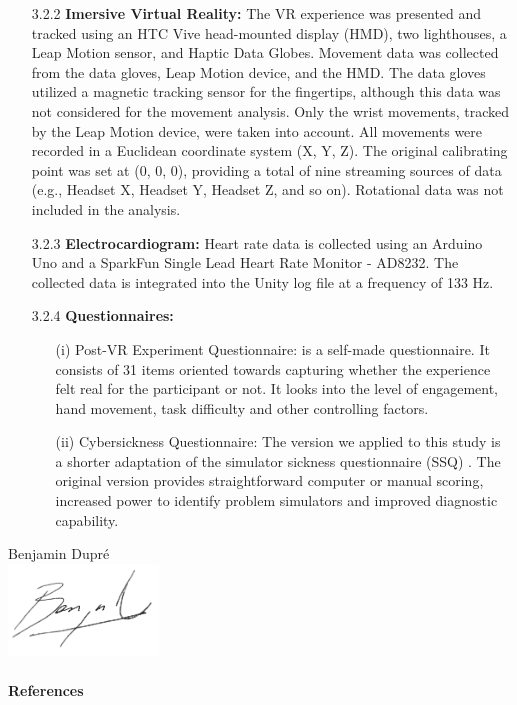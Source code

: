\documentclass[12pt,oneside,openright]{report}
\begin{document}
\begin{enumerate}
    \item[3.2.2] \textbf{Imersive Virtual Reality:} The VR experience was presented and tracked using an HTC Vive head-mounted display (HMD), two lighthouses, a Leap Motion sensor, and Haptic Data Globes. Movement data was collected from the data gloves, Leap Motion device, and the HMD. The data gloves utilized a magnetic tracking sensor for the fingertips, although this data was not considered for the movement analysis. Only the wrist movements, tracked by the Leap Motion device, were taken into account. All movements were recorded in a Euclidean coordinate system (X, Y, Z). The original calibrating point was set at (0, 0, 0), providing a total of nine streaming sources of data (e.g., Headset X, Headset Y, Headset Z, and so on). Rotational data was not included in the analysis.

    \item[3.2.3] \textbf{Electrocardiogram:} Heart rate data is collected using an Arduino Uno and a SparkFun Single Lead Heart Rate Monitor - AD8232. The collected data is integrated into the Unity log file at a frequency of 133 Hz.
\newpage
    \item[3.2.4] \textbf{Questionnaires:}
      \begin{enumerate}
        \item[(i)] Post-VR Experiment Questionnaire: is a self-made questionnaire. It consists of 31 items oriented towards capturing whether the experience felt real for the participant or not. It looks into the level of engagement, hand movement, task difficulty and other controlling factors. 
        \item[(ii)] Cybersickness Questionnaire: The version we applied to this study is a shorter adaptation of the simulator sickness questionnaire (SSQ) \cite*{SSQ93}. The original version provides straightforward computer or manual scoring, increased power to identify problem simulators and improved diagnostic capability.
    \end{enumerate}
  \end{enumerate}
\vspace*{3cm}
\hfill  
\begin{center}
  Benjamin Dupré \\ 
  \includegraphics[width=4cm]{firma.png}
\end{center}

\pagebreak
\paragraph{\textbf{References}}
\printbibliography[heading=none]
\end{document}
